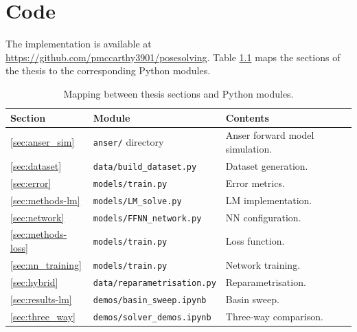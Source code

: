 \chapter{Code}\label{app:code}
The implementation is available at \url{https://github.com/pmccarthy3901/posesolving}. 
Table \ref{tab:code_map} maps the sections of the thesis to the corresponding Python modules.


\begin{table}
  \centering 
  \begin{tabular}{lll}
    \toprule 
    Section & Module & Contents \\
    \midrule 
    \ref{sec:anser_sim} & \lstinline[style=python] |anser/| directory & Anser forward model simulation. \\
    \ref{sec:dataset} & \lstinline[style=python] |data/build_dataset.py| & Dataset generation. \\
    \ref{sec:error} & \lstinline[style=python] |models/train.py| & Error metrics. \\
    \ref{sec:methods-lm} & \lstinline[style=python] |models/LM_solve.py| & LM implementation. \\
    \ref{sec:network} & \lstinline[style=python]|models/FFNN_network.py| & NN configuration. \\
    \ref{sec:methods-loss} & \lstinline[style=python] |models/train.py| & Loss function. \\
    \ref{sec:nn_training} & \lstinline[style=python] |models/train.py| & Network training. \\
    \ref{sec:hybrid} & \lstinline[style=python] |data/reparametrisation.py| & Reparametrisation. \\
    \ref{sec:results-lm} & \lstinline[style=python] |demos/basin_sweep.ipynb| & Basin sweep. \\
    \ref{sec:three_way} & \lstinline[style=python] |demos/solver_demos.ipynb| & Three-way comparison. \\
    \bottomrule 
  \end{tabular}
  \caption{Mapping between thesis sections and Python modules.}
  \label{tab:code_map}
\end{table}

